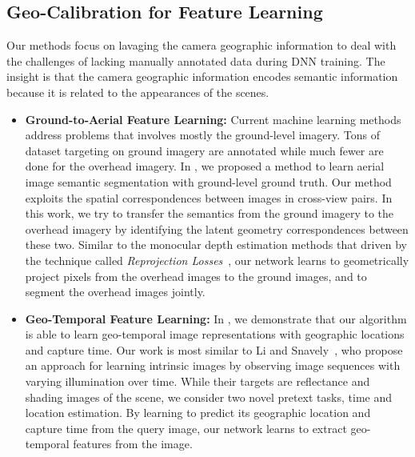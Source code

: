 \subsection{Geo-Calibration for Feature Learning}
Our methods focus on lavaging the camera geographic information to
deal with the challenges of lacking manually annotated data during DNN
training. The insight is that the camera geographic information
encodes semantic information because it is related to the
appearances of the scenes.

\begin{itemize}[noitemsep]
  \item \textbf{Ground-to-Aerial Feature Learning:}
  Current machine learning methods address problems that involves mostly
  the ground-level imagery. Tons of dataset targeting on ground imagery are
  annotated while much fewer are done for the overhead imagery. In
  , we proposed a method to learn aerial image
  semantic segmentation with ground-level ground truth. Our method
  exploits the spatial correspondences between images in cross-view
  pairs. 
  In this work, we try to transfer the semantics from the ground
  imagery to the overhead imagery by identifying the latent geometry
  correspondences between these two.  Similar to the monocular depth
  estimation methods that driven by the technique called {\em
  Reprojection Losses}~\cite{garg2016unsupervised,
  godard2017unsupervised,zhou2017unsupervised, yan2016perspective}, our
  network learns to geometrically project pixels from the overhead
  images to the ground images, and to segment the overhead images
  jointly.
  \newline

  \item \textbf{Geo-Temporal Feature Learning:}
  In , we demonstrate that our algorithm is able to
  learn geo-temporal image representations with geographic locations and
  capture time.
  Our work is most similar to Li and Snavely~\cite{li2018learning},
  who propose an approach for learning intrinsic images by observing
  image sequences with varying illumination over time. While their
  targets are reflectance and shading images of the scene, we consider
  two novel pretext tasks, time and location estimation.
  By learning to predict its geographic location and capture time from the
  query image, our network learns to extract geo-temporal features
  from the image.

\end{itemize}
